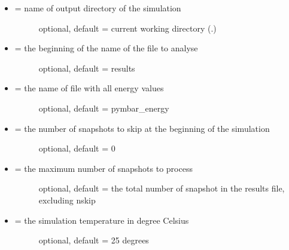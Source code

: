 \documentclass[letterpaper,10pt,english]{sphinxmanual}
\begin{document}
\begin{itemize}
\item {} \begin{description}
\item[{ = name of output directory of the simulation}] \leavevmode
optional, default = current working directory (.)

\end{description}

\item {} \begin{description}
\item[{ = the beginning of the name of the file to analyse}] \leavevmode
optional, default = results

\end{description}

\item {} \begin{description}
\item[{ = the name of file with all energy values}] \leavevmode
optional, default = pymbar\_energy

\end{description}

\item {} \begin{description}
\item[{ = the number of snapshots to skip at the beginning of the simulation}] \leavevmode
optional, default = 0

\end{description}

\item {} \begin{description}
\item[{ = the maximum number of snapshots to process}] \leavevmode
optional, default = the total number of snapshot in the results file, excluding nskip

\end{description}

\item {} \begin{description}
\item[{ = the simulation temperature in degree Celsius}] \leavevmode
optional, default = 25 degrees


\end{description}
\end{itemize}
\end{document}
